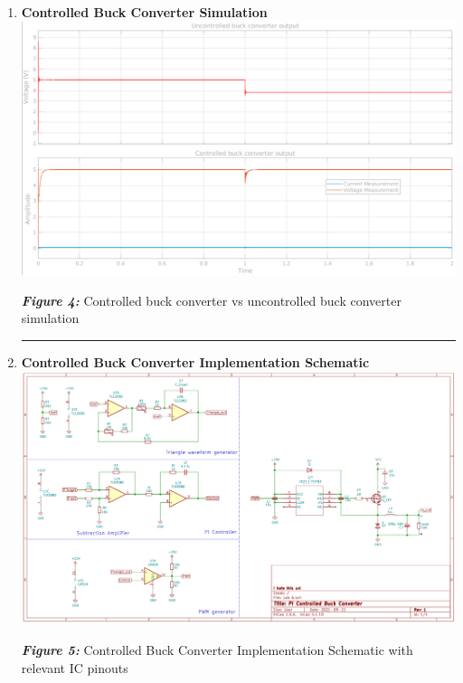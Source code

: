 \documentclass[a4paper,11pt]{article}
\begin{document}
\begin{preview}
\begin{enumerate}
    \hrule
    \item \textbf{Controlled Buck Converter Simulation} \\

    \includegraphics[width = \textwidth]{pi_sim.png}
    
    \begin{center}
        \textbf{\textit{Figure 4:}} Controlled buck converter vs uncontrolled buck converter simulation\\
    \end{center}


    \hrule
    \item \textbf{Controlled Buck Converter Implementation Schematic} \\

    \includegraphics[width = \textwidth]{shem.pdf}
    
    \begin{center}
        \textbf{\textit{Figure 5:}} Controlled Buck Converter Implementation Schematic with relevant IC pinouts
    \end{center}



\end{enumerate}

\end{preview}
\end{document}
